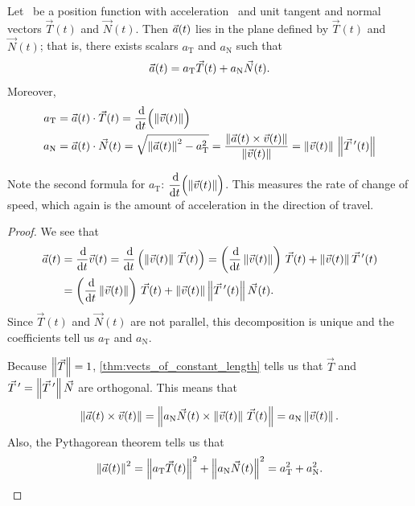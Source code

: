 {
\begin{theorem}\label{thm:acc_plane}%
Let \vrt\ be a position function with acceleration \vat\ and unit tangent and normal vectors $\vec T(t)$ and $\vec N(t)$. Then $\vec a(t)$ lies in the plane defined by $\vec T(t)$ and $\vec N(t)$; that is, there exists scalars $a_{\mathrm{T}}$ and $a_{\mathrm{N}}$ such that
\[\vec a(t) = a_{\mathrm{T}}\vec T(t) + a_{\mathrm{N}}\vec N(t).\]
Moreover,
\begin{align*}
a_\mathrm{T} &= \vec a(t)\cdot\vec T(t) = \frac{\operatorname{d}\!}{\operatorname{d}\! t}\Bigl(\left\lVert \vec v(t) \right\rVert\Bigr) \\
a_\mathrm{N} &= \vec a(t)\cdot \vec N(t) = \sqrt{\left\lVert \vec a(t) \right\rVert^2-a_\mathrm{T}^2} = \frac{\left\lVert \vec a(t)\times\vec v(t) \right\rVert}{\left\lVert \vec v(t) \right\rVert} = \left\lVert \vec v(t) \right\rVert\,\left\lVert \vec T\,'(t) \right\rVert
\end{align*}%
%
%
%
%
\end{theorem}
}

Note the second formula for $a_{\mathrm{T}}$: $\displaystyle \frac{\operatorname{d}\!}{\operatorname{d}\! t}\Bigl(\left\lVert \vec v(t) \right\rVert\Bigr)$. This measures the rate of change of speed, which again is the amount of acceleration in the direction of travel.

\begin{proof}
We see that
\begin{align*}
 \vat
 &=\frac\dd{\dd t}\vvt=\frac\dd{\dd t}\left(\norm{\vvt}\,\vec T(t)\right)
 =\left(\frac\dd{\dd t}\norm{\vvt}\right)\,\vec T(t)+\norm{\vvt}\vec T\,'(t) \\
 &=\left(\frac\dd{\dd t}\norm{\vvt}\right)\,\vec T(t)+\norm{\vvt}\norm{\vec T\,'(t)}\vec N(t).
\end{align*}
Since $\vec T(t)$ and $\vec N(t)$ are not parallel, this decomposition is unique and the coefficients tell us $a_\mathrm{T}$ and $a_\mathrm{N}$.

Because $\left\lVert \vec T \right\rVert=1$, \autoref{thm:vects_of_constant_length} tells us that $\vec T$ and $\vec T\,'=\left\lVert \vec T\,' \right\rVert\vec N$ are orthogonal.  This means that
\[
 \left\lVert \vec a(t)\times\vec v(t) \right\rVert
 =\left\lVert a_\mathrm{N}\vec N(t)\times\left\lVert \vec v(t) \right\rVert\,\vec T(t) \right\rVert
 =a_\mathrm{N}\left\lVert \vec v(t) \right\rVert.
\]
Also, the Pythagorean theorem tells us that
\[
 \left\lVert \vec a(t) \right\rVert^2=\left\lVert a_\mathrm{T}\vec T(t) \right\rVert^2+\left\lVert a_\mathrm{N}\vec N(t) \right\rVert^2
 =a_\mathrm{T}^2+a_\mathrm{N}^2.\qedhere
\]
\end{proof}


